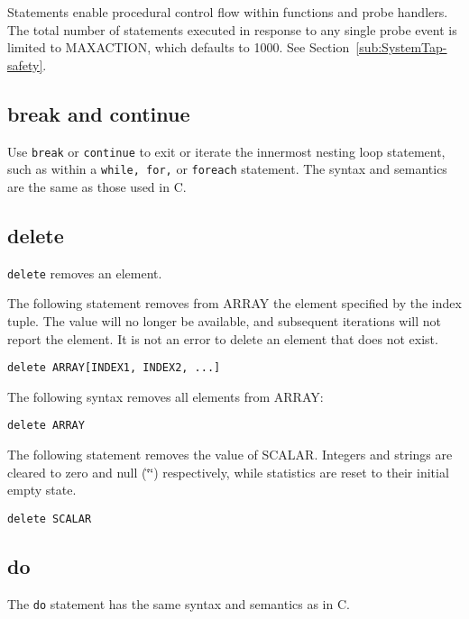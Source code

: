 \documentclass[twoside,english]{article}
\newenvironment{vindent}
{\begin{list}{}{\setlength{\listparindent}{6pt}}
\item[]}
{\end{list}}
\begin{document}
Statements enable procedural control flow within functions and probe handlers.
The total number of statements executed in response to any single probe event
is limited to MAXACTION, which defaults to 1000. See Section~\ref{sub:SystemTap-safety}.


\subsection{break and continue}
Use \texttt{break} or \texttt{continue} to exit or iterate the innermost
nesting loop statement, such as within a \texttt{while, for,} or \texttt{foreach}
statement. The syntax and semantics are the same as those used in C.


\subsection{delete}
\texttt{delete} removes an element.

The following statement removes from ARRAY the element specified by the index
tuple. The value will no longer be available, and subsequent iterations will
not report the element. It is not an error to delete an element that does
not exist.

\begin{vindent}
\begin{verbatim}
delete ARRAY[INDEX1, INDEX2, ...]
\end{verbatim}
\end{vindent}
The following syntax removes all elements from ARRAY:

\begin{vindent}
\begin{verbatim}
delete ARRAY
\end{verbatim}
\end{vindent}
The following statement removes the value of SCALAR. Integers and strings
are cleared to zero and null (\char`\"{}\char`\"{}) respectively, while statistics
are reset to their initial empty state.

\begin{vindent}
\begin{verbatim}
delete SCALAR
\end{verbatim}
\end{vindent}

\subsection{do}
The \texttt{do} statement has the same syntax and semantics as in C.
\end{document}
